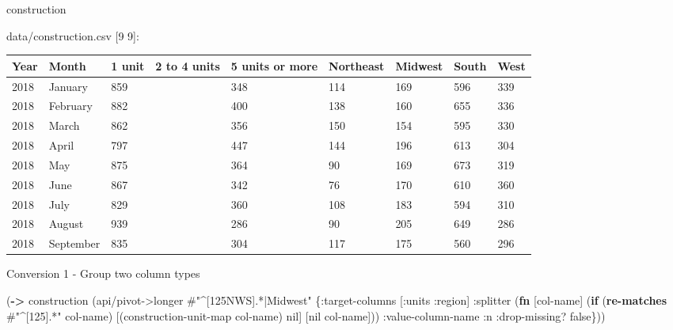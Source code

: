 \documentclass[]{article}
\newenvironment{Shaded}{\begin{snugshade}}{\end{snugshade}}
\newcommand{\KeywordTok}[1]{\textcolor[rgb]{0.13,0.29,0.53}{\textbf{#1}}}
\newcommand{\SpecialStringTok}[1]{\textcolor[rgb]{0.31,0.60,0.02}{#1}}
\newcommand{\VariableTok}[1]{\textcolor[rgb]{0.00,0.00,0.00}{#1}}
\newcommand{\AttributeTok}[1]{\textcolor[rgb]{0.77,0.63,0.00}{#1}}
\newcommand{\NormalTok}[1]{#1}
\begin{document}
\begin{Shaded}
\begin{Highlighting}[]
\NormalTok{construction}
\end{Highlighting}
\end{Shaded}

data/construction.csv {[}9 9{]}:

\begin{longtable}[]{@{}lllllllll@{}}
\toprule
Year & Month & 1 unit & 2 to 4 units & 5 units or more & Northeast &
Midwest & South & West\tabularnewline
\midrule
\endhead
2018 & January & 859 & & 348 & 114 & 169 & 596 & 339\tabularnewline
2018 & February & 882 & & 400 & 138 & 160 & 655 & 336\tabularnewline
2018 & March & 862 & & 356 & 150 & 154 & 595 & 330\tabularnewline
2018 & April & 797 & & 447 & 144 & 196 & 613 & 304\tabularnewline
2018 & May & 875 & & 364 & 90 & 169 & 673 & 319\tabularnewline
2018 & June & 867 & & 342 & 76 & 170 & 610 & 360\tabularnewline
2018 & July & 829 & & 360 & 108 & 183 & 594 & 310\tabularnewline
2018 & August & 939 & & 286 & 90 & 205 & 649 & 286\tabularnewline
2018 & September & 835 & & 304 & 117 & 175 & 560 & 296\tabularnewline
\bottomrule
\end{longtable}

Conversion 1 - Group two column types

\begin{Shaded}
\begin{Highlighting}[]
\NormalTok{(}\KeywordTok{->}\NormalTok{ construction}
\NormalTok{    (api/pivot->longer }\SpecialStringTok{#"^[125NWS].*|Midwest"}\NormalTok{ \{}\AttributeTok{:target-columns}\NormalTok{ [}\AttributeTok{:units} \AttributeTok{:region}\NormalTok{]}
                                               \AttributeTok{:splitter}\NormalTok{ (}\KeywordTok{fn}\NormalTok{ [col-name]}
\NormalTok{                                                           (}\KeywordTok{if}\NormalTok{ (}\KeywordTok{re-matches} \SpecialStringTok{#"^[125].*"}\NormalTok{ col-name)}
\NormalTok{                                                             [(construction-unit-map col-name) }\VariableTok{nil}\NormalTok{]}
\NormalTok{                                                             [}\VariableTok{nil}\NormalTok{ col-name]))}
                                               \AttributeTok{:value-column-name} \AttributeTok{:n}
                                               \AttributeTok{:drop-missing}\NormalTok{? }\VariableTok{false}\NormalTok{\}))}
\end{Highlighting}
\end{Shaded}
\end{document}
